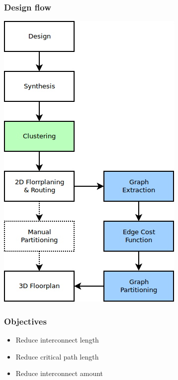 \documentclass[xcolor={x11names, rgb, usenames, dvipsnames}]{beamer}
\begin{document}
\begin{frame}
  \frametitle{Design flow}
  \centering
  \includegraphics[height=0.85\textheight]{design-flow}
\end{frame}

\begin{frame}
  \frametitle{Objectives}
  \begin{itemize}
    \item Reduce interconnect length
    \item Reduce critical path length
    \item Reduce interconnect amount
  \end{itemize}
\end{frame}






% 	





% 
% 
\end{document}
